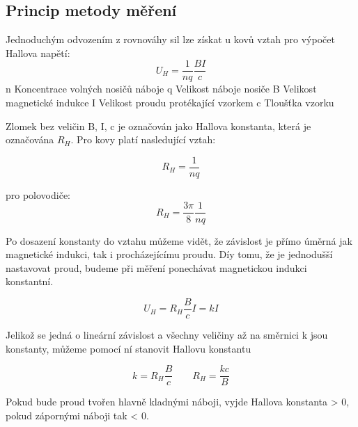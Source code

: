\documentclass{praktikum}
\begin{document}
\subsection{Princip metody měření}
Jednoduchým odvozením z rovnováhy sil lze získat u kovů vztah pro výpočet Hallova napětí:
\begin{equation}
\label{eqn:theory_uh_odvozene}
U_H = \frac{1}{nq}\frac{BI}{c}
\end{equation}
n \dotfill Koncentrace volných nosičů náboje \linebreak
q \dotfill Velikost náboje nosiče \linebreak
B \dotfill Velikost magnetické indukce \linebreak
I \dotfill Velikost proudu protékající vzorkem \linebreak
c \dotfill Tloušťka vzorku \newpage 

Zlomek bez veličin B, I, c je označován jako Hallova konstanta, která je označována $R_H$. Pro kovy platí nasledující vztah:

\begin{equation}
\label{eqn:theory_rh_hall_kovy}
R_H = \frac{1}{nq}
\end{equation}

pro polovodiče:
\begin{equation}
\label{eqn:theory_rh_hall_polovodiče}
R_H = \frac{3\pi}{8}\frac{1}{nq}
\end{equation}

Po dosazení konstanty do vztahu můžeme vidět, že závislost je přímo úměrná jak magnetické indukci, tak i procházejícímu proudu. Díy tomu, že je jednodušší nastavovat proud, budeme při měření ponechávat magnetickou indukci konstantní.

\begin{equation}
\label{eqn:theory_uh_lin}
U_H = R_H\frac{B}{c}I = kI
\end{equation}

Jelikož se jedná o lineární závislost a všechny veličiny až na směrnici k jsou konstanty, můžeme pomocí ní stanovit Hallovu konstantu

\begin{equation}
\label{theory_k_rh_hallovka}
k = R_H\frac{B}{c} \quad \quad
R_H = \frac{kc}{B}
\end{equation}

Pokud bude proud tvořen hlavně kladnými náboji, vyjde Hallova konstanta > 0, pokud zápornými náboji tak < 0.
\end{document}
